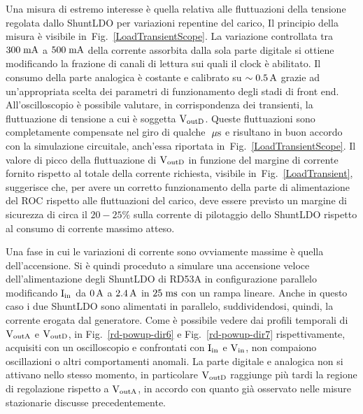 Una misura di estremo interesse è quella relativa alle fluttuazioni della tensione regolata dallo ShuntLDO per variazioni repentine del carico, Il principio della misura \`e visibile in~Fig.~\ref{LoadTransientScope}. La variazione controllata tra $300\rm \; mA$ a $500\rm \; mA$ della corrente assorbita dalla sola parte digitale si ottiene modificando la frazione di canali di lettura sui quali il clock \`e abilitato.  Il consumo della parte analogica \`e costante e calibrato su $\sim 0.5\rm \, A$ grazie ad un'appropriata scelta dei parametri di funzionamento degli stadi di front end. 
All'oscilloscopio \`e possibile valutare, in corrispondenza dei transienti, la fluttuazione di tensione a cui \`e soggetta $\mathrm{V_{outD}}$. Queste fluttuazioni sono completamente compensate nel giro di qualche $\; \mu \rm s$ e risultano in buon accordo con la simulazione circuitale, anch'essa riportata in~Fig.~\ref{LoadTransientScope}. 
Il valore di picco della fluttuazione di $\mathrm{V_{outD}}$ in funzione del margine di corrente fornito rispetto al totale della corrente richiesta, visibile in~Fig.~\ref{LoadTransient}, suggerisce che, per avere un corretto funzionamento della parte di alimentazione del ROC rispetto alle fluttuazioni del carico,  deve essere previsto un margine di sicurezza di circa il $20-25
\%$ sulla corrente di pilotaggio dello ShuntLDO rispetto al consumo di corrente massimo atteso. 

Una fase in cui le variazioni di corrente sono ovviamente massime \`e quella dell'accensione. Si è quindi proceduto a simulare una accensione veloce dell'alimentazione degli ShuntLDO  di RD53A in configurazione parallelo modificando $\mathrm{I_{in}}$ da $0\rm \, A$ a $2.4\rm \, A$ in $25\; \rm m \rm s$ con un rampa lineare. Anche in questo caso i due ShuntLDO sono alimentati in parallelo, suddividendosi, quindi, la corrente erogata dal generatore. Come è possibile vedere dai profili temporali di $\mathrm{V_{outA}}$ e $\mathrm{V_{outD}}$, in Fig.~\ref{rd-powup-dir6} e Fig.~\ref{rd-powup-dir7} rispettivamente, acquisiti con un oscilloscopio e confrontati con $\mathrm{I_{in}}$ e $\mathrm{V_{in}}$, non compaiono oscillazioni o altri comportamenti anomali.
La parte digitale e analogica non si attivano nello stesso momento, in particolare $\mathrm{V_{outD}}$ raggiunge pi\`u tardi la regione di regolazione rispetto a $\mathrm{V_{outA}}$, in accordo con quanto già osservato nelle misure stazionarie discusse precedentemente.

